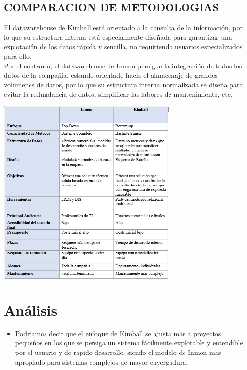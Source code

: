 \documentclass[%
 reprint,
 amsmath,amssymb,
 aps,
]{revtex4-1}
\begin{document}
\subsection{COMPARACION DE METODOLOGIAS}	
El datawarehouse de Kimball está orientado a la consulta de la información, por lo que su estructura interna está especialmente diseñada para garantizar una explotación de los datos rápida y sencilla, no requiriendo usuarios especializados para ello.\\
 Por el contrario, el datawarehouse de Inmon persigue la integración de todos los datos de la compañía, estando orientado hacia el almacenaje de grandes volúmenes de datos, por lo que su estructura interna normalizada se diseña para evitar la redundancia de datos, simplificar las labores de mantenimiento, etc.\citep{kumar}\\


				\begin{center}
					\includegraphics[width=9cm]{./IMAGENES/Inmon-Kimball}
				\end{center}


\section{Análisis}

\begin{itemize}
\item Podríamos decir que el enfoque de Kimball se ajusta mas a proyectos pequeños en los que se persiga un sistema fácilmente explotable y entendible por el usuario y de rapido desarrollo, siendo el modelo de Inmon mas apropiado para sistemas complejos de mayor envergadura.

\end{itemize}
\end{document}

